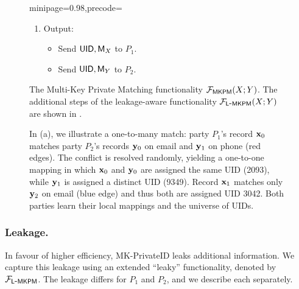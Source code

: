 \begin{figure}
{\begin{minipage}[t]{0.98\columnwidth}
\begin{adjustbox}{minipage=0.98\textwidth,precode=\dbox}
      \end{adjustbox}
      \begin{enumerate}
        \addtocounter{enumi}{14}
      \item Output:\hfill
        \begin{itemize}[label=-]
        \item Send $\mathsf{UID}, {\mathsf{M}_X}$  to $P_1$.
        \item Send $\mathsf{UID}, {\mathsf{M}_Y}$  to $P_2$.
        \end{itemize}
      \end{enumerate}
    \end{minipage}
  }
  \caption{The Multi-Key Private Matching functionality $\mathcal{F}_{\mathsf{MKPM}}(X;
    Y)$. The additional steps of the leakage-aware functionality
    $\mathcal{F}_{\mathsf{L\mbox{-}MKPM}}(X; Y)$ are shown in \protect{}.}
  \label{fig:MKPM}
\end{figure}

\begin{figure}[t]
  \centering
  \def\rowspace{-.4pt}
  \def\minwidthemail{2.1cm}
  \def\minwidthphone{2.1cm}
  \def\minwidthid{.5cm}
  \def\minwidthuid{.8cm}
  \def\linecorr{-.4pt}
  \def\blockminheight{1.3em}
  \caption{In (a), we illustrate a one-to-many match: party $P_1$’s record
    $\mathbf{x}_0$ matches party $P_2$’s records $\mathbf{y}_0$ on email and $\mathbf{y}_1$ on phone
    (red edges). The conflict is resolved randomly, yielding a one-to-one
    mapping in which $\mathbf{x}_0$ and $\mathbf{y}_0$ are assigned the same UID (2093), while
    $\mathbf{y}_1$ is assigned a distinct UID (9349). Record $\mathbf{x}_1$ matches only
    $\mathbf{y}_2$ on email (blue edge) and thus both are assigned UID 3042. Both
    parties learn their local mappings and the universe of UIDs.
    \label{fig:matching-logic-example}}
\end{figure}

\subsubsection{Leakage.}
\label{sec:leakage}
In favour of higher efficiency, MK-PrivateID leaks additional information. We
capture this leakage using an extended ``leaky'' functionality, denoted by
$\mathcal{F}_{\mathsf{L\mbox{-}MKPM}{}}$. The leakage differs for $P_1$ and $P_2$, and we describe
each separately.

